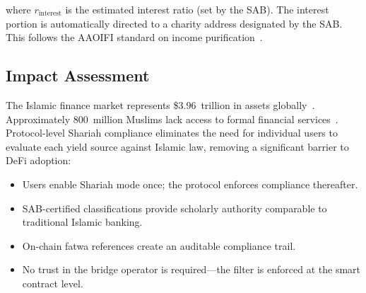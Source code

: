 where $r_{\text{interest}}$ is the estimated interest ratio (set by the SAB). The interest portion is automatically directed to a charity address designated by the SAB. This follows the AAOIFI standard on income purification~\cite{aaoifi2015}.

\subsection{Impact Assessment}

The Islamic finance market represents \$3.96~trillion in assets globally~\cite{ifdi2024}. Approximately 800~million Muslims lack access to formal financial services~\cite{worldbank2022}. Protocol-level Shariah compliance eliminates the need for individual users to evaluate each yield source against Islamic law, removing a significant barrier to DeFi adoption:

\begin{itemize}[nosep]
  \item Users enable Shariah mode once; the protocol enforces compliance thereafter.
  \item SAB-certified classifications provide scholarly authority comparable to traditional Islamic banking.
  \item On-chain fatwa references create an auditable compliance trail.
  \item No trust in the bridge operator is required---the filter is enforced at the smart contract level.
\end{itemize}

